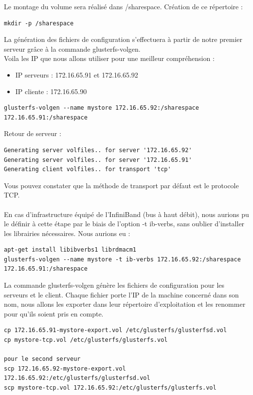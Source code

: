 \documentclass[12pt]{report}
\begin{document}
Le montage du volume sera réalisé dans /sharespace. Création de ce répertoire :\\
\begin{lstlisting}
mkdir -p /sharespace
	  \end{lstlisting}
La génération des fichiers de configuration s'effectuera à partir de notre premier serveur grâce à la commande glusterfs-volgen.\\
Voila les IP que nous allons utiliser pour une meilleur compréhension :
	\begin{itemize}
		\item IP serveurs : 172.16.65.91 et 172.16.65.92
		\item IP cliente :  172.16.65.90\\
	\end{itemize}
\begin{lstlisting}
glusterfs-volgen --name mystore 172.16.65.92:/sharespace 172.16.65.91:/sharespace
\end{lstlisting}
Retour de serveur :
\begin{lstlisting}
Generating server volfiles.. for server '172.16.65.92'
Generating server volfiles.. for server '172.16.65.91'
Generating client volfiles.. for transport 'tcp'
	  \end{lstlisting}
Vous pouvez constater que la méthode de transport par défaut est le protocole TCP.\\\\
En cas d'infrastructure équipé de l'InfiniBand (bus à haut débit), nous aurions pu le définir à cette étape par le biais de l'option -t ib-verbs, sans oublier d'installer les librairies nécessaires. Nous aurions eu :\\
\begin{lstlisting}
apt-get install libibverbs1 librdmacm1
glusterfs-volgen --name mystore -t ib-verbs 172.16.65.92:/sharespace 172.16.65.91:/sharespace
	  \end{lstlisting}
La commande glusterfs-volgen génère les fichiers de configuration pour les serveurs et le client. Chaque fichier porte l'IP de la machine concerné dans son nom, nous allons les exporter dans leur répertoire d'exploitation et les renommer pour qu'ils soient pris en compte.
\begin{lstlisting}
cp 172.16.65.91-mystore-export.vol /etc/glusterfs/glusterfsd.vol
cp mystore-tcp.vol /etc/glusterfs/glusterfs.vol

pour le second serveur
scp 172.16.65.92-mystore-export.vol 172.16.65.92:/etc/glusterfs/glusterfsd.vol
scp mystore-tcp.vol 172.16.65.92:/etc/glusterfs/glusterfs.vol
	  \end{lstlisting}
\end{document}
